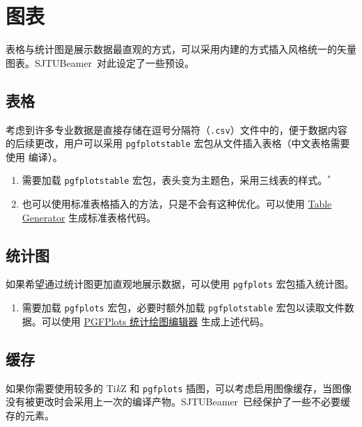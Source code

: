 \documentclass[
    UTF8,
    heading=true,
    12pt,
    a4paper
]{ctexrep}
\newenvironment{commentlist}{\begin{enumerate}\small}{\end{enumerate}}
\def\themename{\textsf{SJTUBeamer}}
\begin{document}
\chapter{图表}

表格与统计图是展示数据最直观的方式，可以采用内建的方式插入风格统一的矢量图表。\themename\ 对此设定了一些预设。

\section{表格}

考虑到许多专业数据是直接存储在逗号分隔符（\texttt{.csv}）文件中的，便于数据内容的后续更改，用户可以采用 \texttt{pgfplotstable} 宏包从文件插入表格（中文表格需要使用  编译）。


\begin{commentlist}
  \item 需要加载 \texttt{pgfplotstable} 宏包，表头变为主题色，采用三线表的样式。$^*$
  \item 也可以使用标准表格插入的方法，只是不会有这种优化。可以使用 \href{https://www.tablesgenerator.com/latex_tables}{Table Generator} 生成标准表格代码。
\end{commentlist}

\section{统计图}

如果希望通过统计图更加直观地展示数据，可以使用 \texttt{pgfplots} 宏包插入统计图。


\begin{commentlist}
  \item 需要加载 \texttt{pgfplots} 宏包，必要时额外加载 \texttt{pgfplotstable} 宏包以读取文件数据。可以使用 \href{https://logcreative.github.io/PGFPlotsEdt/}{PGFPlots 统计绘图编辑器} 生成上述代码。
\end{commentlist}

\section{缓存}

如果你需要使用较多的 Ti\emph{k}Z 和 \texttt{pgfplots} 插图，可以考虑启用图像缓存，当图像没有被更改时会采用上一次的编译产物。\themename\ 已经保护了一些不必要缓存的元素。

\end{document}

